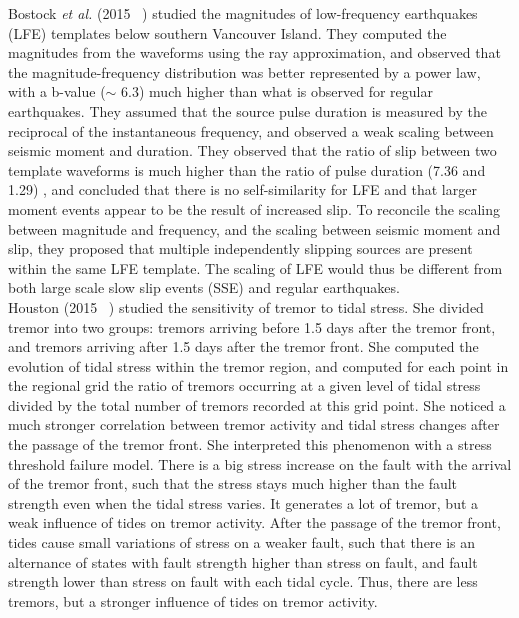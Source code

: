 \documentclass[main.tex]{subfiles}
\begin{document}
Bostock \textit{et al.} (2015 ~\cite{BOS_2015}) studied the magnitudes of low-frequency earthquakes (LFE) templates below southern Vancouver Island. They computed the magnitudes from the waveforms using the ray approximation, and observed that the magnitude-frequency distribution was better represented by a power law, with a b-value ($\sim$ 6.3) much higher than what is observed for regular earthquakes. They assumed that the source pulse duration is measured by the reciprocal of the instantaneous frequency, and observed a weak scaling between seismic moment and duration. They observed that the ratio of slip between two template waveforms is much higher than the ratio of pulse duration (7.36 and 1.29) , and concluded that there is no self-similarity for LFE and that larger moment events appear to be the result of increased slip. To reconcile the scaling between magnitude and frequency, and the scaling between seismic moment and slip, they proposed that multiple independently slipping sources are present within the same LFE template.  The scaling of LFE would thus be different from both large scale slow slip events (SSE) and regular earthquakes. \\

Houston (2015 ~\cite{HOU_2015}) studied the sensitivity of tremor to tidal stress. She divided tremor into two groups: tremors arriving before 1.5 days after the tremor front, and tremors arriving after 1.5 days after the tremor front. She computed the evolution of tidal stress within the tremor region, and computed for each point in the regional grid the ratio of tremors occurring at a given level of tidal stress divided by the total number of tremors recorded at this grid point. She noticed a much stronger correlation between tremor activity and tidal stress changes after the passage of the tremor front. She interpreted this phenomenon with a stress threshold failure model. There is a big stress increase on the fault with the arrival of the tremor front, such that the stress stays much higher than the fault strength even when the tidal stress varies. It generates a lot of tremor, but a weak influence of tides on tremor activity. After the passage of the tremor front, tides cause small variations of stress on a weaker fault, such that there is an alternance of states with fault strength higher than stress on fault, and fault strength lower than stress on fault with each tidal cycle. Thus, there are less tremors, but a stronger influence of tides on tremor activity. \\
\end{document}
